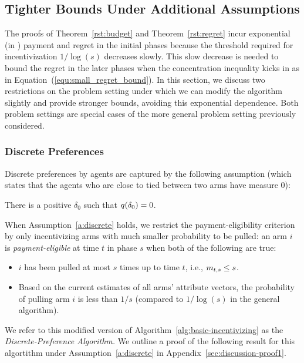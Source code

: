 \subsection{Tighter Bounds Under Additional Assumptions}

The proofs of Theorem~\ref{rst:budget} and Theorem~\ref{rst:regret} incur exponential (in \ARMNUM) payment and regret in the initial phases because the threshold required for incentivization $1/\log(s)$ decreases slowly.
This slow decrease is needed to bound the regret in the later phases when the concentration inequality kicks in as in Equation~(\ref{equ:small_regret_bound}).
In this section, we discuss two restrictions on the problem setting under which  we can modify the algorithm slightly and provide stronger bounds, avoiding this exponential dependence.
Both problem settings are special cases of the more general problem setting previously considered.

\subsubsection{Discrete Preferences}
Discrete preferences by agents are captured by the following assumption (which states that the agents who are close to tied between two arms have measure 0):

\begin{assumption}
\label{a:discrete}
There is a positive $\delta_0$ such that
$q(\delta_0) = 0$.
\end{assumption}

When Assumption~\ref{a:discrete} holds, we restrict the payment-eligibility criterion by only incentivizing arms with much smaller probability to be pulled: an arm $i$ is \emph{payment-eligible} at time $t$ in phase $s$ when both of the following are true:
\begin{itemize}
\item $i$ has been pulled at most
$s$ times up to time $t$, i.e., $m_{t,s} \leq s$.
\item Based on the current estimates  of all arms' attribute vectors, the probability of pulling arm $i$ is less than $1/s$ (compared to $1/\log(s)$ in the general algorithm).
\end{itemize}

We refer to this modified version of Algorithm~\ref{alg:basic-incentivizing} as the \emph{Discrete-Preference Algorithm.}
We outline a proof of the following result for this algortithm under Assumption~\ref{a:discrete} in Appendix~\ref{sec:discussion-proof1}.

